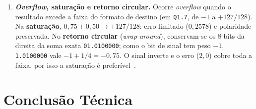\documentclass[11pt,a4paper]{article}
\begin{document}
\begin{enumerate}[leftmargin=1.6em, itemsep=3pt]
    \item \textbf{\textit{Overflow}, saturação e retorno circular.}
    Ocorre \textit{overflow} quando o resultado excede a faixa do formato de destino (em \texttt{Q1.7}, de $-1$ a $+127/128$). Na \textbf{saturação}, $0,75 + 0,50 \to +127/128$: erro limitado ($0,2578$) e polaridade preservada. No \textbf{retorno circular} (\textit{wrap-around}), conservam-se os 8 bits da direita da soma exata \texttt{01.0100000}; como o bit de sinal tem peso $-1$, \texttt{1.0100000} vale $-1 + 1/4 = -0,75$. O sinal inverte e o erro ($2,0$) cobre toda a faixa, por isso a saturação é preferível~\cite{aula17, aula18}.
\end{enumerate}

\FloatBarrier
\section{Conclusão Técnica}
\end{document}
